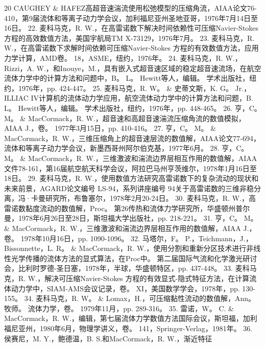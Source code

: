\documentclass[UTF8,11pt,a4paper,openany,fontset=fandol]{ctexbook}
\begin{document}
20 CAUGHEY \& HAFEZ高超音速湍流使用松弛模型的压缩角流，AIAA论文76-410，第9届流体和等离子动力学会议，加利福尼亚州圣地亚哥，1976年7月14日至16日。 22. 麦科马克，R. W.，在高雷诺数下解决时间依赖性可压缩Navier-Stokes 方程的高效数值方法，美国宇航局TM X-73129，1976年7月。 23. 麦科马克，R. W.，在高雷诺数下求解时间依赖可压缩Navier-Stokes 方程的有效数值方法，应用力学计算，AMD卷。 18，ASME，纽约，1976年。 24. 麦科马克，R. W.，Rizzi，A. W.，和Inouye，M.，具有嵌入式超音速区域的稳定超音速流场，在航空流体力学中的计算方法和问题中，B。 L。 Hewitt等人，编辑。 学术出版社，纽约，1976年，pp. 424-447。 25. 麦科马克，R. W。 \& 史蒂文斯，K. G。 Jr.，ILLIAC IV计算机的流体动力学应用，航空流体动力学中的计算方法和问题，B. L。 Hewitt等人，编辑。 学术出版社，纽约，1976年，pp. 448-465。 26. 亨，C。 M。 \& MacCormack，R. W.，超音速和高超音速湍流压缩角流的数值模拟，AIAA J.，卷。 1977年3月15日，pp. 410-416。 27. 亨，C。 M。 \& MacCormack，R. W.，三维压缩角上的超音速层流的数值解，AIAA论文77-694，流体和等离子动力学会议，新墨西哥州阿尔伯克基，1977年6月。 28. 亨，C。 M。 \& MacCormack，R. W.，三维激波和湍流边界层相互作用的数值解，AIAA文件78-161，第16届航空航天科学会议，阿拉巴马州亨茨维尔，1978年1月16日至18日。 29. 麦科马克，R. W.，使用数值方法研究高雷诺数下的复杂流动的现状和未来前景，AGARD论文编号 LS-94，系列讲座编号 94关于高雷诺数的三维非稳分离，冯·卡曼研究所，布鲁塞尔，1978年2月20-24日。 30. 麦科马克，R. W.，高雷诺数黏度流动的数值解，Proc。 第26传热和流体力学研究所，华盛顿州普尔曼，1978年6月26日至28日，斯坦福大学出版社，pp. 218-221。 31. 亨，C。 M。 \& MacCormack，R. W.，三维激波和湍流边界层相互作用的数值解，AIAA J.，卷。 1978年10月16日，pp. 1090-1096。 32. 马塔尔，F。 P.，Teichmann，J.，Bissonnette，L. R。 \& MacCormack，R. W.，使用分割和重新分区技术进行非线性光学传播的流体方法的显式算法，在Proc中。 第二届国际气流和化学激光研讨会，比利时罗德-圣日塞，1978年，半球，华盛顿特区，pp. 437-448。 33. 麦科马克，R. W.，解决可压缩Navier-Stokes 方程的有效显式-隐式特征方法，在计算流体动力学中，SIAM-AMS会议记录，卷。 XI，美国数学学会，1978年，pp. 130-155。 34. 麦科马克，R. W。 \& Lomax，H.，可压缩黏性流动的数值解，Ann。 牧师。 流体力学，卷。 1979年11月，pp. 289-316。 35. 雷诺，W。 C. \& MacCormack，R. W.，编辑，第七届流体力学数值方法国际会议，斯坦福，加利福尼亚州，1980年6月，物理学讲义，卷。 141，Springer-Verlag，1981年。 36. 侯赛尼，M. Y.，鲍德温，B. S.和MacCormack，R. W.，渐近特征
\end{document}

